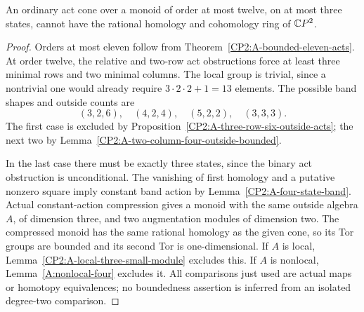 \begin{proposition}
\label{CP2:A-twelve-three-state-rational}
An ordinary act cone over a monoid of order at most twelve,
on at most three states, cannot have the rational homology
and cohomology ring of $\mathbb{C}P^2$.
\end{proposition}
\begin{proof}
Orders at most eleven follow from
Theorem~\ref{CP2:A-bounded-eleven-acts}. At order twelve,
the relative and two-row act obstructions force at least
three minimal rows and two minimal columns. The local group
is trivial, since a nontrivial one would already require
$3\cdot2\cdot2+1=13$ elements. The possible band shapes and
outside counts are
\[
 (3,2,6),\quad(4,2,4),\quad(5,2,2),\quad(3,3,3).
\]
The first case is excluded by
Proposition~\ref{CP2:A-three-row-six-outside-acts}; the next
two by Lemma~\ref{CP2:A-two-column-four-outside-bounded}.

In the last case there must be exactly three states, since
the binary act obstruction is unconditional. The vanishing
of first homology and a putative nonzero square imply
constant band action by Lemma~\ref{CP2:A-four-state-band}.
Actual constant-action compression gives a monoid with the
same outside algebra $A$, of dimension three, and two
augmentation modules of dimension two. The compressed
monoid has the same rational homology as the given cone,
so its Tor groups are bounded and its second Tor is
one-dimensional. If $A$ is local,
Lemma~\ref{CP2:A-local-three-small-module} excludes this.
If $A$ is nonlocal, Lemma~\ref{A:nonlocal-four} excludes it.
All comparisons just used are actual maps or homotopy
equivalences; no boundedness assertion is inferred from
an isolated degree-two comparison.
\end{proof}

